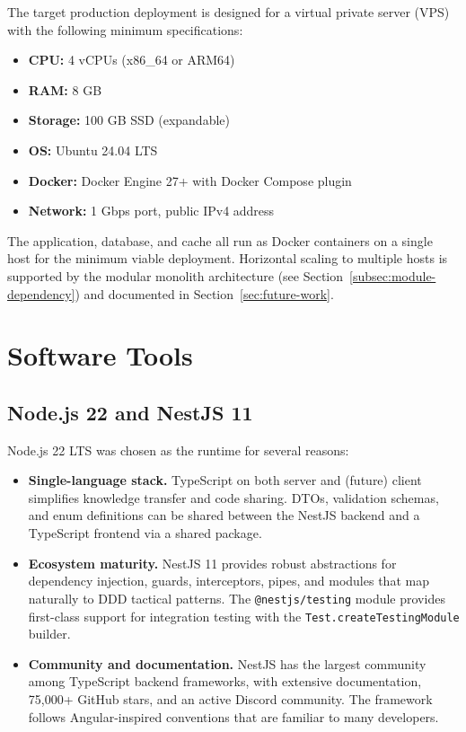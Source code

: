 The target production deployment is designed for a virtual private server (VPS) with the following minimum specifications:

\begin{itemize}
  \item \textbf{CPU:} 4 vCPUs (x86\_64 or ARM64)
  \item \textbf{RAM:} 8 GB
  \item \textbf{Storage:} 100 GB SSD (expandable)
  \item \textbf{OS:} Ubuntu 24.04 LTS
  \item \textbf{Docker:} Docker Engine 27+ with Docker Compose plugin
  \item \textbf{Network:} 1 Gbps port, public IPv4 address
\end{itemize}

The application, database, and cache all run as Docker containers on a single host for the minimum viable deployment. Horizontal scaling to multiple hosts is supported by the modular monolith architecture (see Section~\ref{subsec:module-dependency}) and documented in Section~\ref{sec:future-work}.

\section{Software Tools}
\label{sec:app-software}

\subsection{Node.js 22 and NestJS 11}
\label{subsec:app-nodejs}

Node.js 22 LTS was chosen as the runtime for several reasons:

\begin{itemize}
  \item \textbf{Single-language stack.} TypeScript on both server and (future) client simplifies knowledge transfer and code sharing. DTOs, validation schemas, and enum definitions can be shared between the NestJS backend and a TypeScript frontend via a shared package.
  \item \textbf{Ecosystem maturity.} NestJS 11 provides robust abstractions for dependency injection, guards, interceptors, pipes, and modules that map naturally to DDD tactical patterns. The \texttt{@nestjs/testing} module provides first-class support for integration testing with the \texttt{Test.createTestingModule} builder.
  \item \textbf{Community and documentation.} NestJS has the largest community among TypeScript backend frameworks, with extensive documentation, 75,000+ GitHub stars, and an active Discord community. The framework follows Angular-inspired conventions that are familiar to many developers.
\end{itemize}

